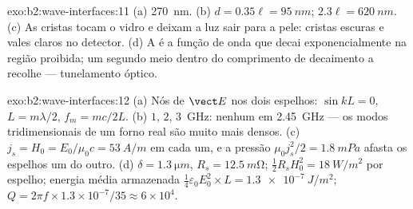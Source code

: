 \begin{solution}{exo:b2:wave-interfaces:11}
(a) \qty{270}{nm}. (b) $d = 0.35\ell = \qty{95}{nm}$; $2.3\ell = \qty{620}{nm}$. (c) As
cristas tocam o vidro e deixam a luz sair para a pele: cristas
escuras e vales claros no detector. (d) A  é a
função de onda que decai exponencialmente na região proibida; um segundo
meio dentro do comprimento de decaimento a recolhe --- tunelamento óptico.
\end{solution}

\begin{solution}{exo:b2:wave-interfaces:12}
(a) Nós de $\vect E$ nos dois espelhos: $\sin kL = 0$, $L = m\lambda/2$, $f_m = mc/2L$.
(b) $1$, $2$, \qty{3}{GHz}: nenhum em \qty{2.45}{GHz} --- os modos tridimensionais
de um forno real são muito mais densos. (c) $j_s = H_0 = E_0/\mu_0c = \qty{53}{A/m}$
em cada um, e a pressão $\mu_0j_s^2/2 = \qty{1.8}{mPa}$ afasta os espelhos
um do outro. (d) $\delta = \qty{1.3}{\micro m}$, $R_s = \qty{12.5}{m\ohm}$; $\tfrac12R_sH_0^2 =
\qty{18}{W/m^2}$ por espelho; energia média armazenada $\tfrac14\varepsilon_0E_0^2 \times L = \qty{1.3e-7}{J/m^2}$;
$Q = 2\pi f \times 1.3 \times 10^{-7}/35 \approx 6 \times 10^4$.
\end{solution}

